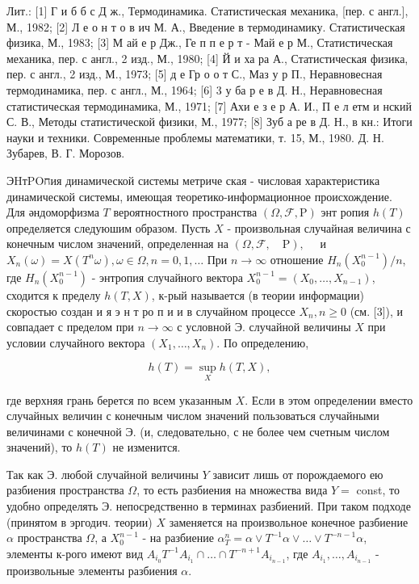 \documentclass[10pt]{article}
\begin{document}
Лит.: [1] Г и б б с Д ж., Термодинамика. Статистическая механика, [пер. с англ.], М., 1982; [2] Л е о н т о в ич М. А., Введение в термодинамику. Статистическая физика, М., 1983; [3] М ай е р Дж., Ге п п е р т - Май е р М., Статистическая механика, пер. с англ., 2 изд., М., 1980; [4] Й и ха ра А., Статистическая физика, пер. с англ., 2 изд., М., 1973; [5] д е Гр о о т С., Маз у р П., Неравновесная термодинамика, пер. с англ., М., 1964; [6] 3 у ба р е в Д. Н., Неравновесная статистическая термодинамика, М., 1971; [7] Ахи е з е р А. И., П е л етм и нский С. В., Методы статистической физики, М., 1977; [8] Зуб а ре в Д. Н., в кн.: Итоги науки и техники. Современные проблемы математики, т. 15, М., 1980. Д. Н. Зубарев, В. Г. Морозов.



ЭHтPOחия динамической системы метриче ская - числовая характеристика динамической системы, имеющая теоретико-информационное происхождение. Для әндоморфизма $T$ вероятностного пространства $(\Omega, \mathscr{F}, \mathrm{P})$ энт ропия $h(T)$ определяется следуюшим образом. Пусть $X$ - произвольная случайная величина с конечным числом значений, определенная на $(\Omega, \mathscr{F}, \quad \mathrm{P}), \quad$ и $X_{n}(\omega)=X\left(T^{n} \omega\right), \omega \in \Omega, n=0,1, \ldots$ При $n \rightarrow \infty$ отношение $H_{n}\left(X_{0}^{n-1}\right) / n$, где $H_{n}\left(X_{0}^{n-1}\right)$ - энтропия случайного вектора $X_{0}^{n-1}=\left(X_{0}, \ldots, X_{n-1}\right)$, сходится к пределу $h(T, X)$, к-рый называется (в теории информации) скоростью создан и я э н т ро п и и в случайном процессе $X_{n}, n \geqslant 0$ (см. [3]), и совпадает с пределом при $n \rightarrow \infty$ с условной $Э$. случайной величины $X$ при условии случайного вектора $\left(X_{1}, \ldots, X_{n}\right)$. По определению,



\[

h(T)=\sup _{X} h(T, X),

\]



где верхняя грань берется по всем указанным $X$. Если в этом определении вместо случайных величин с конечным числом значений пользоваться случайными величинами с конечной Э. (и, следовательно, с не более чем счетным числом значений), то $h(T)$ не изменится.



Так как Э. любой случайной величины $Y$ зависит лишь от порождаемого ею разбиения пространства $\Omega$, то есть разбиения на множества вида $Y=$ const, то удобно определять $Э$. непосредственно в терминах разбиений. При таком подходе (принятом в эргодич. теории) $X$ заменяется на произвольное конечное разбиение $\alpha$ пространства $\Omega$, а $X_{0}^{n-1}$ - на разбиение $\alpha_{T}^{n}=\alpha \vee T^{-1} \alpha \vee \ldots \vee T^{-n-1} \alpha$, элементы к-рого имеют вид $A_{i_{0}} T^{-1} A_{i_{1}} \cap \ldots \cap T^{-n+1} A_{i_{n-1}}$, где $A_{i_{1}}, \ldots, A_{i_{n-1}}$ - произвольные элементы разбиения $\alpha$.
\end{document}

